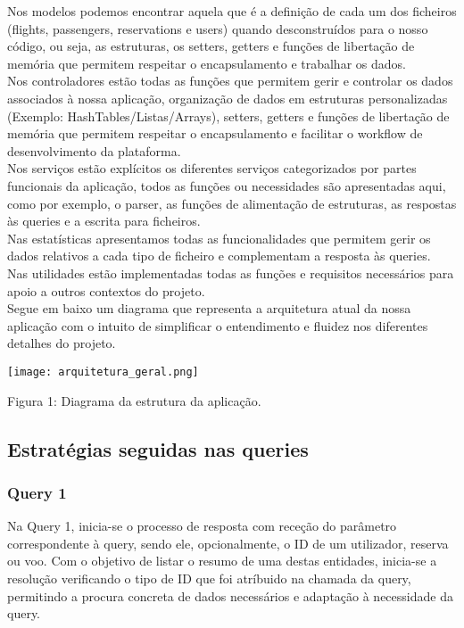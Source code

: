 \documentclass[12pt,a4paper]{article}
\begin{document}
    Nos modelos podemos encontrar aquela que é a definição de cada um dos ficheiros (flights, passengers, reservations e users) quando desconstruídos para o nosso código, ou seja, as estruturas, os setters, getters e funções de libertação de memória que permitem respeitar o encapsulamento e trabalhar os dados.\\

    Nos controladores estão todas as funções que permitem gerir e controlar os dados associados à nossa aplicação, organização de dados em estruturas personalizadas (Exemplo: HashTables/Listas/Arrays), setters, getters e funções de libertação de memória que permitem respeitar o encapsulamento e facilitar o workflow de desenvolvimento da plataforma.\\

    Nos serviços estão explícitos os diferentes serviços categorizados por partes funcionais da aplicação, todos as funções ou necessidades são apresentadas aqui, como por exemplo, o parser, as funções de alimentação de estruturas, as respostas às queries e a escrita para ficheiros.\\

    Nas estatísticas apresentamos todas as funcionalidades que permitem gerir os dados relativos a cada tipo de ficheiro e complementam a resposta às queries.\\

    Nas utilidades estão implementadas todas as funções e requisitos necessários para apoio a outros contextos do projeto.\\

    Segue em baixo um diagrama que representa a arquitetura atual da nossa aplicação com o intuito de simplificar o entendimento e fluidez nos diferentes detalhes do projeto.\\

    \begin{center}
    \centering
    \texttt{[image: arquitetura\_geral.png]}
    \end{center}

    \begin{center}
    Figura 1: Diagrama da estrutura da aplicação.
    \end{center}
    
    \subsection{Estratégias seguidas nas queries}
    \subsubsection{Query 1}
    \hspace{0,6cm}Na Query 1, inicia-se o processo de resposta com receção do parâmetro correspondente à query, sendo ele, opcionalmente, o ID de um utilizador, reserva ou voo. Com o objetivo de listar o resumo de uma destas entidades, inicia-se a resolução verificando o tipo de ID que foi atríbuido na chamada da query, permitindo a procura concreta de dados necessários e adaptação à necessidade da query.\\
    
\end{document}
